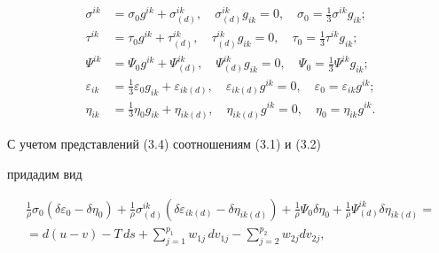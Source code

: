 \begin{equation}


\begin{split}


\sigma^{ik}&=\sigma_0g^{ik}+\sigma^{ik}_{(d)},\quad


\sigma^{ik}_{(d)}g_{ik}=0,\quad


\sigma_0=\frac{1}{3}\sigma^{ik}g_{ik};\\


\tau^{ik}&=\tau_0g^{ik}+\tau^{ik}_{(d)},\quad


\tau^{ik}_{(d)}g_{ik}=0,\quad \tau_0=\frac{1}{3}\tau^{ik}g_{ik};\\


\Psi^{ik}&=\Psi_0g^{ik}+\Psi^{ik}_{(d)},\quad


\Psi^{ik}_{(d)}g_{ik}=0,\quad \Psi_0=\frac{1}{3}\Psi^{ik}g_{ik};\\


\varepsilon_{ik}&=\frac{1}{3}\varepsilon_0g_{ik}+\varepsilon_{ik(d)},\quad


\varepsilon_{ik(d)}g^{ik}=0,\quad


\varepsilon_0=\varepsilon_{ik}g^{ik};\\


\eta_{ik}&=\frac{1}{3}\eta_0g_{ik}+\eta_{ik(d)},\quad


\eta_{ik(d)}g^{ik}=0,\quad \eta_0=\eta_{ik}g^{ik}.


\end{split}


\tag{3.4}


\end{equation}


С учетом представлений (3.4) соотношениям (3.1) и (3.2)


придадим вид


\begin{multline}


\frac{1}{\rho }\sigma_0(\delta\varepsilon_0-\delta\eta_0)+


\frac{1}{\rho }\sigma^{ik}_{(d)}(\delta\varepsilon_{ik(d)}-


\delta\eta_{ik(d)})+\frac{1}{\rho }\Psi_0\delta\eta_0+


\frac{1}{\rho }\Psi^{ik}_{(d)}\delta\eta_{ik(d)}=\\


=d(u-v)-T\,ds+\sum^{p_1}_{j=1}w_{1j}\,dv_{1j}-\sum^{p_2}_{j=2}


w_{2j}dv_{2j},\tag{3.5}


\end{multline}



